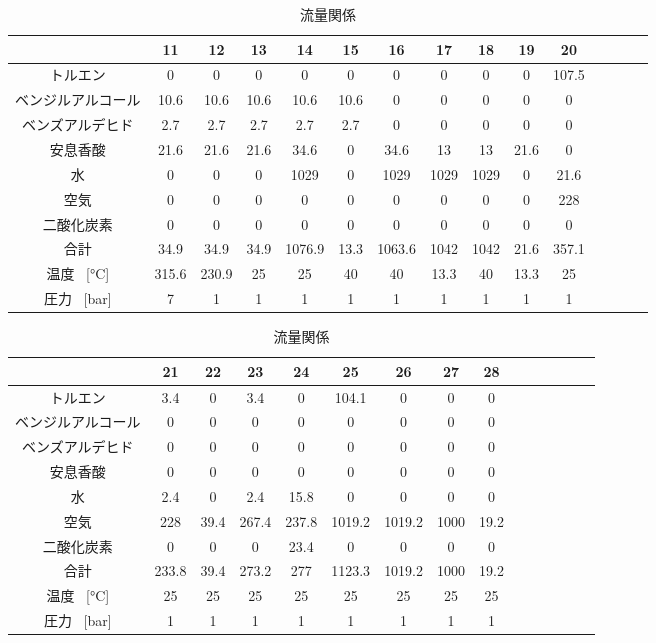 \documentclass[a4j]{jsreport}
\begin{document}
\begin{table}[htbp]
  \centering
  \caption{流量関係}
  \label{流量関係2}
  \begin{tabular}{ccccccccccccccc}
    \hline
    [\si{\kilo \mole \per \hour}] & 11 & 12 & 13 & 14 & 15 & 16 & 17 & 18 & 19 & 20 \\
    \hline
    トルエン & 0 & 0 & 0 & 0 & 0 & 0 & 0 & 0 & 0 & 107.5 \\
    ベンジルアルコール & 10.6 & 10.6 & 10.6 & 10.6 & 10.6 & 0 & 0 & 0 & 0 & 0 \\
    ベンズアルデヒド & 2.7 & 2.7 & 2.7 & 2.7 & 2.7 & 0 & 0 & 0 & 0 & 0 \\
    安息香酸 & 21.6 & 21.6 & 21.6 & 34.6 & 0 & 34.6 & 13 & 13 & 21.6 & 0 \\
    水 & 0 & 0 & 0 & 1029 & 0 & 1029 & 1029 & 1029 & 0 & 21.6 \\
    空気 & 0 & 0 & 0 & 0 & 0 & 0 & 0 & 0 & 0 & 228 \\
    二酸化炭素 & 0 & 0 & 0 & 0 & 0 & 0 & 0 & 0 & 0 & 0 \\
    \hline
    合計 & 34.9 & 34.9 & 34.9 & 1076.9 & 13.3 & 1063.6 & 1042 & 1042 & 21.6 & 357.1 \\
    \hline
    温度 \, [\si{\degreeCelsius}] & 315.6 & 230.9 & 25 & 25 & 40 & 40 & 13.3 & 40 & 13.3 & 25 \\
    圧力 \, [\si{\bar}] & 7 & 1 & 1 & 1 & 1 & 1 & 1 & 1 & 1 & 1 \\
    \hline
  \end{tabular}
\end{table}

\begin{table}[htbp]
  \caption{流量関係}
  \label{流量関係3}
  \centering
  \begin{tabular}{ccccccccccccccc}
    \hline
    [\si{\kilo \mole \per \hour}] & 21 & 22 & 23 & 24 & 25 & 26 & 27 & 28 &  &  \\
    \hline
    トルエン & 3.4 & 0 & 3.4 & 0 & 104.1 & 0 & 0 & 0 &  &  \\
    ベンジルアルコール & 0 & 0 & 0 & 0 & 0 & 0 & 0 & 0 &  &  \\
    ベンズアルデヒド & 0 & 0 & 0 & 0 & 0 & 0 & 0 & 0 &  &  \\
    安息香酸 & 0 & 0 & 0 & 0 & 0 & 0 & 0 & 0 &  &  \\
    水 & 2.4 & 0 & 2.4 & 15.8 & 0 & 0 & 0 & 0 &  &  \\
    空気 & 228 & 39.4 & 267.4 & 237.8 & 1019.2 & 1019.2 & 1000 & 19.2 &  &  \\
    二酸化炭素 & 0 & 0 & 0 & 23.4 & 0 & 0 & 0 & 0 &  &  \\
    \hline
    合計 & 233.8 & 39.4 & 273.2 & 277 & 1123.3 & 1019.2 & 1000 & 19.2 &  &  \\
    \hline
    温度 \, [\si{\degreeCelsius}] & 25 & 25 & 25 & 25 & 25 & 25 & 25 & 25 &  &  \\
    圧力 \, [\si{\bar}] & 1 & 1 & 1 & 1 & 1 & 1 & 1 & 1 &  &  \\
    \hline
  \end{tabular}
\end{table}
\end{document}

